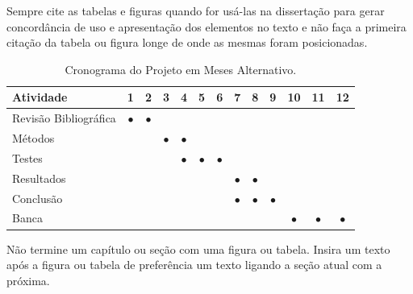 \documentclass[
    12pt,				       %
    openright,			       %
    oneside,			       %
    a4paper,			       %
    chapter=TITLE,             %
    sumario=tradicional,       %
    english,			        %
    brazil, 				    %
 ]{abntex2}
\begin{document}
Sempre cite as tabelas e figuras quando for usá-las na dissertação para gerar concordância de uso e apresentação dos elementos no texto e não faça a primeira citação da tabela ou figura longe de onde as mesmas foram posicionadas.

\begin{table}[!ht]
    \begin{center}
        \caption{Cronograma do Projeto em Meses Alternativo.}
        \label{tab:cronograma2}
        \begin{tabular}{lcccccccccccc} %
            \toprule
            \textbf{Atividade} & \textbf{1} & \textbf{2} & \textbf{3} & \textbf{4} & \textbf{5} & \textbf{6} & \textbf{7} & \textbf{8} & \textbf{9} & \textbf{10} & \textbf{11} & \textbf{12} \\
            \midrule
                Revisão Bibliográfica & $\bullet$ & $\bullet$ & & & & & & & & & & \\
                Métodos & & & $\bullet$ & $\bullet$ & & & & & & & & \\
                Testes & & & & $\bullet$ & $\bullet$ & $\bullet$ & & & & & & \\
                Resultados & & & & & & & $\bullet$ & $\bullet$ & & & & \\
                Conclusão & & & & & & & $\bullet$ & $\bullet$ & $\bullet$ & & & \\
                Banca & & & & & & &&&& $\bullet$ & $\bullet$ & $\bullet$ \\
            \bottomrule
        \end{tabular}%
    \end{center}
\end{table}

Não termine um capítulo ou seção com uma figura ou tabela. Insira um texto após a figura ou tabela de preferência um texto ligando a seção atual com a próxima.


\postextual



\thispagestyle{empty}

\end{document}
